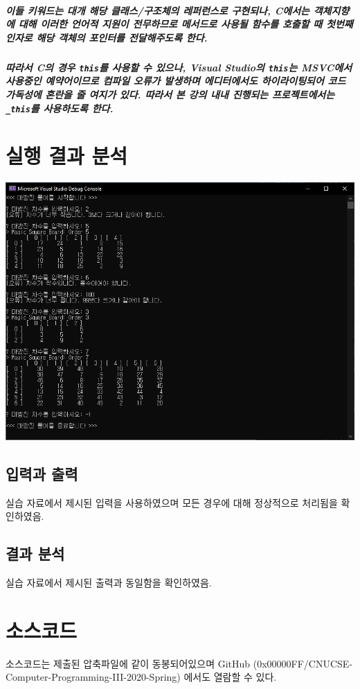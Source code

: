 \documentclass[UTF8]{report}
\begin{document}
            \paragraph{%
                \normalfont 이들 키워드는 대개 해당 클래스/구조체의 레퍼런스로 구현되나, C에서는 객체지향에 대해 이러한 언어적 지원이 전무하므로 메서드로 사용될 함수를 호출할 때 첫번째 인자로 해당 객체의 포인터를 전달해주도록 한다.
            }

            \paragraph{%
                \normalfont 따라서 C의 경우 \texttt{this}를 사용할 수 있으나, Visual Studio의 \texttt{this}는 MSVC에서 사용중인 예약어이므로 컴파일 오류가 발생하며 에디터에서도 하이라이팅되어 코드 가독성에 혼란을 줄 여지가 있다. 따라서 본 강의 내내 진행되는 프로젝트에서는 \texttt{\_this}를 사용하도록 한다.
            }            

        
    \chapter{실행 결과 분석}
        \includegraphics[width=\textwidth]{test_result.png}
        \section{입력과 출력}
            실습 자료에서 제시된 입력을 사용하였으며 모든 경우에 대해 정상적으로 처리됨을 확인하였음.
        \section{결과 분석}
            실습 자료에서 제시된 출력과 동일함을 확인하였음.

    \chapter{소스코드}
        소스코드는 제출된 압축파일에 같이 동봉되어있으며 GitHub (0x00000FF/CNUCSE-Computer-Programming-III-2020-Spring) 에서도 열람할 수 있다.
\end{document}
